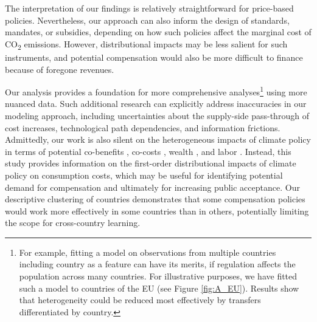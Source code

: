 \documentclass[12pt, a4paper]{article}
\begin{document}
The interpretation of our findings is relatively straightforward for price-based policies. Nevertheless, our approach can also inform the design of standards, mandates, or subsidies, depending on how such policies affect the marginal cost of CO\textsubscript{2} emissions. However, distributional impacts may be less salient for such instruments, and potential compensation would also be more difficult to finance because of foregone revenues. %

Our analysis provides a foundation for more comprehensive analyses\footnote{For example, fitting a model on observations from multiple countries including country as a feature can have its merits, if regulation affects the population across many countries. For illustrative purposes, we have fitted such a model to countries of the EU (see Figure \ref{fig:A_EU}). Results show that heterogeneity could be reduced most effectively by transfers differentiated by country.} using more nuanced data. Such additional research can explicitly address inaccuracies in our modeling approach, including uncertainties about the supply-side pass-through of cost increases, technological path dependencies, and information frictions. Admittedly, our work is also silent on the heterogeneous impacts of climate policy in terms of potential co-benefits \autocite[e.g.,][]{Holland.2019,Karlsson.2020}, co-costs \autocite[e.g.,][]{Fuje.2019,Greve.2022}, wealth \autocite[e.g.,][]{Fullerton.2011}, and labor \autocite[e.g.,][]{Castellanos.2024}. Instead, this study provides information on the first-order distributional impacts of climate policy on consumption costs, which may be useful for identifying potential demand for compensation and ultimately for increasing public acceptance. Our descriptive clustering of countries demonstrates that some compensation policies would work more effectively in some countries than in others, potentially limiting the scope for cross-country learning. %
\end{document}
